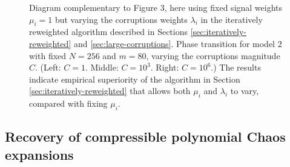 {{\begin{figure}
\begin{center}
  \caption{Diagram complementary to Figure 3, here using fixed signal weights $\mu_i = 1$ but varying the corruptions weights $\lambda_i$ in the iteratively reweighted algorithm described in Sections \ref{sec:iteratively-reweighted} and \ref{sec:large-corruptions}. Phase transition for model $2$ with fixed $N = 256$ and $m= 80$, varying the corruptions magnitude $C$. (Left: $C = 1$. Middle: $C = 10^3$. Right: $C = 10^6$.) The results indicate empirical superiority of the algorithm in Section \ref{sec:iteratively-reweighted} that allows both $\mu_i$ and $\lambda_i$ to vary, compared with fixing $\mu_i$.}\label{fig:reweighted-fixedmu}
\end{center}
\end{figure}
}



}

\subsection{Recovery of compressible polynomial Chaos expansions}\label{sec:results-pce}


